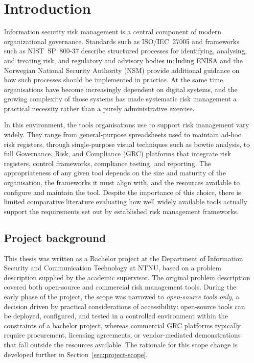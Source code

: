 \section{Introduction}

Information security risk management is a central component of modern
organizational governance. Standards such as ISO/IEC~27005 and frameworks
such as NIST~SP~800-37 describe structured processes for identifying,
analysing, and treating risk, and regulatory and advisory bodies including
ENISA and the Norwegian National Security Authority (NSM) provide additional
guidance on how such processes should be implemented in practice. At the
same time, organisations have become increasingly dependent on digital
systems, and the growing complexity of those systems has made systematic
risk management a practical necessity rather than a purely administrative
exercise.

In this environment, the tools organisations use to support risk management
vary widely. They range from general-purpose spreadsheets used to maintain
ad-hoc risk registers, through single-purpose visual techniques such as
bowtie analysis, to full Governance, Risk, and Compliance (GRC) platforms
that integrate risk registers, control frameworks, compliance testing, and
reporting. The appropriateness of any given tool depends on the size and
maturity of the organisation, the frameworks it must align with, and the
resources available to configure and maintain the tool. Despite the
importance of this choice, there is limited comparative literature
evaluating how well widely available tools actually support the requirements
set out by established risk management frameworks.

\subsection{Project background}

This thesis was written as a Bachelor project at the Department of
Information Security and Communication Technology at NTNU, based on a
problem description supplied by the academic supervisor. The original
problem description covered both open-source and commercial risk management
tools. During the early phase of the project, the scope was narrowed to
\textit{open-source tools only}, a decision driven by practical
considerations of accessibility: open-source tools can be deployed,
configured, and tested in a controlled environment within the constraints
of a bachelor project, whereas commercial GRC platforms typically require
procurement, licensing agreements, or vendor-mediated demonstrations that
fall outside the resources available. The rationale for this scope change
is developed further in Section~\ref{sec:project-scope}.

